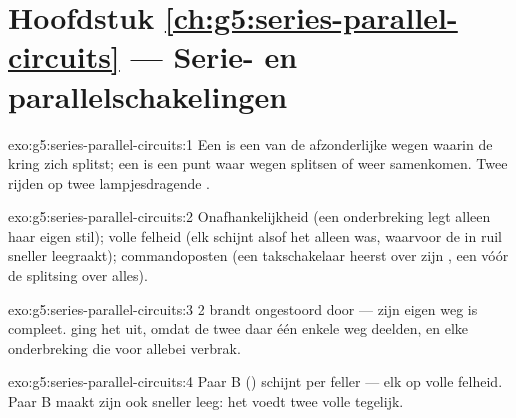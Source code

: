 \section*{Hoofdstuk \ref{ch:g5:series-parallel-circuits} --- Serie- en parallelschakelingen}

\begin{solution}{exo:g5:series-parallel-circuits:1}
Een  is een van de afzonderlijke wegen waarin de kring zich
splitst; een  is een punt waar wegen splitsen of weer
samenkomen. Twee   rijden op twee
lampjesdragende .
\end{solution}

\begin{solution}{exo:g5:series-parallel-circuits:2}
Onafhankelijkheid (een onderbreking legt alleen haar eigen
 stil); volle felheid (elk  schijnt alsof het alleen was,
waarvoor de  in ruil sneller leegraakt); commandoposten (een
takschakelaar heerst over zijn , een  vóór de
splitsing over alles).
\end{solution}

\begin{solution}{exo:g5:series-parallel-circuits:3}
 2 brandt ongestoord door --- zijn eigen weg is compleet.
 ging het uit, omdat de twee  daar één enkele weg
deelden, en elke onderbreking die voor allebei verbrak.
\end{solution}

\begin{solution}{exo:g5:series-parallel-circuits:4}
Paar B () schijnt per  feller --- elk op volle felheid.
Paar B maakt zijn  ook sneller leeg: het voedt twee volle
 tegelijk.
\end{solution}

